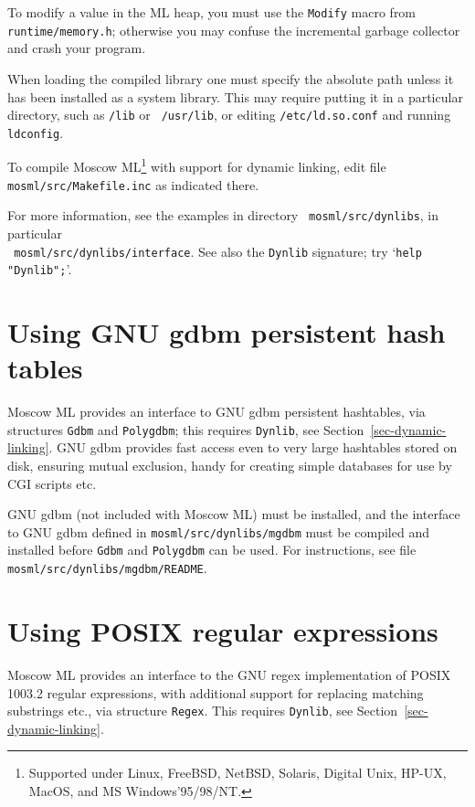 \documentclass[fleqn]{article}
\begin{document}
To modify a value in the ML heap, you must use the {\tt Modify} macro
from {\tt runtime/memory.h}; otherwise you may confuse the incremental
garbage collector and crash your program.

When loading the compiled library one must specify the absolute path
unless it has been installed as a system library.  This may require
putting it in a particular directory, such as {\tt /lib} or {\tt
  /usr/lib}, or editing {\tt /etc/ld.so.conf} and running {\tt
  ldconfig}.

To compile Moscow ML\footnote{Supported under Linux, FreeBSD, NetBSD,
  Solaris, Digital Unix, HP-UX, MacOS, and MS Windows'95/98/NT.} with
support for dynamic linking, edit file {\tt mosml/src/Makefile.inc} as
indicated there.

For more information, see the examples in directory {\tt
  mosml/src/dynlibs}, in particular\\ {\tt
  mosml/src/dynlibs/interface}.  See also the {\tt Dynlib} signature;
try `{\tt help "Dynlib";}'.


\section{Using GNU gdbm persistent hash tables }
\label{sec-using-mgdbm}

Moscow ML provides an interface to GNU gdbm persistent hashtables, via
structures {\tt Gdbm} and {\tt Polygdbm}; this requires {\tt Dynlib},
see Section~\ref{sec-dynamic-linking}.  GNU gdbm provides fast access
even to very large hashtables stored on disk, ensuring mutual
exclusion, handy for creating simple databases for use by CGI scripts
etc.

GNU gdbm (not included with Moscow ML) must be installed, and the
interface to GNU gdbm defined in {\tt mosml/src/dynlibs/mgdbm} must be
compiled and installed before
{\tt Gdbm} and {\tt Polygdbm} can be used.  For instructions, see file
{\tt mosml/src/dynlibs/mgdbm/README}.


\section{Using POSIX regular expressions}
\label{sec-using-mregex}

Moscow ML provides an interface to the GNU regex implementation of
POSIX 1003.2 regular expressions, with additional support for
replacing matching substrings etc., via structure {\tt Regex}\@.  This
requires {\tt Dynlib}, see Section~\ref{sec-dynamic-linking}.
\end{document}
